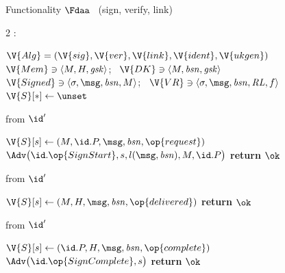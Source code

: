 \begin{interface}[nofloat]{Functionality $\Fdaa$ \ (sign, verify, link) \\
}

{\scriptsize
\setlength{\columnsep}{1.4em}
\begin{multicols}{2}
:
\begin{algorithmic}[1]
\setcounter{contline}{0}\algcont
\State $\V{Alg} = (\V{sig}, \V{ver}, \V{link}, \V{ident}, \V{ukgen})$
\State $\V{Mem} \ni \langle M, H, \mathit{gsk}\rangle$; \ $\V{DK} \ni \langle M, \mathit{bsn}, \mathit{gsk}\rangle$
\State $\V{Signed} \ni \langle \sigma, \msg, \mathit{bsn}, M\rangle$; \ $\V{VR} \ni \langle \sigma, \msg, \mathit{bsn}, \mathit{RL}, f\rangle$
\State $\V{S}[*] \gets \unset$
\algsave
\end{algorithmic}
\vspace{1.4ex}

 \quad from $\id'$
\begin{algorithmic}[1]
\algcont
{}
 \label{ln:daamember}
\State $\V{S}[s] \gets (M, \id.P, \msg, \mathit{bsn}, \op{request})$
\State $\Adv\bigl(\id.\op{SignStart}, s, l(\msg, \mathit{bsn}), M, \id.P\bigr)$ \label{ln:daasignleak}
\State \textbf{return} $\ok$
\algsave
\end{algorithmic}
\vspace{1.4ex}

 \quad from $\id'$
\begin{algorithmic}[1]
\algcont
{}
\State $\V{S}[s] \gets (M, H, \msg, \mathit{bsn}, \op{delivered})$
\State \textbf{return} $\ok$
\algsave
\end{algorithmic}
\vspace{1.4ex}

 \quad from $\id'$
\begin{algorithmic}[1]
\algcont
{} \label{ln:daatpmconsent}
\State $\V{S}[s] \gets (\id.P, H, \msg, \mathit{bsn}, \op{complete})$
\State $\Adv\bigl(\id.\op{SignComplete}, s\bigr)$
\State \textbf{return} $\ok$
\algsave
\end{algorithmic}
\vspace{1.4ex}


\end{multicols}}
\end{interface}
